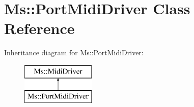 \hypertarget{class_ms_1_1_port_midi_driver}{}\section{Ms\+:\+:Port\+Midi\+Driver Class Reference}
\label{class_ms_1_1_port_midi_driver}
Inheritance diagram for Ms\+:\+:Port\+Midi\+Driver\+:\begin{figure}[H]
\begin{center}
\leavevmode
\includegraphics[height=2.000000cm]{class_ms_1_1_port_midi_driver}
\end{center}
\end{figure}
